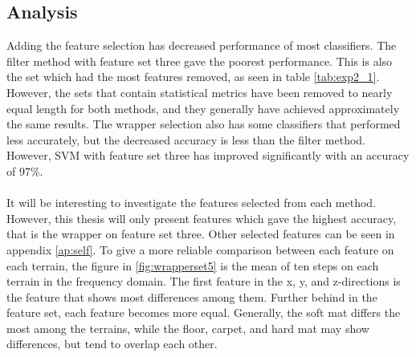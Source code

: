 \documentclass[USenglish]{ifimaster}  %
\begin{document}
\subsection{Analysis}
Adding the feature selection has decreased performance of most classifiers. The filter method with feature set three gave the poorest performance. This is also the set which had the most features removed, as seen in table \ref{tab:exp2_1}. However, the sets that contain statistical metrics have been removed to nearly equal length for both methods, and they generally have achieved approximately the same results. The wrapper selection also has some classifiers that performed less accurately, but the decreased accuracy is less than the filter method. However, SVM with feature set three has improved significantly with an accuracy of 97\%.
\\
\\
It will be interesting to investigate the features selected from each method. However, this thesis will only present features which gave the highest accuracy, that is the wrapper on feature set three. Other selected features can be seen in appendix \ref{ap:self}. To give a more reliable comparison between each feature on each terrain, the figure in \ref{fig:wrapperset5} is the mean of ten steps on each terrain in the frequency domain. The first feature in the x, y, and z-directions is the feature that shows most differences among them. Further behind in the feature set, each feature becomes more equal. Generally, the soft mat differs the most among the terrains, while the floor, carpet, and hard mat may show differences, but tend to overlap each other.
\end{document}
